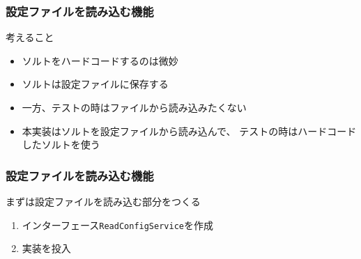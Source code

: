 \begin{frame}
  \frametitle{設定ファイルを読み込む機能}

  \begin{block}{考えること}
    \begin{itemize}
      \item<2-> ソルトをハードコードするのは微妙
      \item<3-> ソルトは設定ファイルに保存する
      \item<4-> 一方、テストの時はファイルから読み込みたくない
        \begin{center}
        \end{center}
      \item<6-> 本実装はソルトを設定ファイルから読み込んで、
        テストの時はハードコードしたソルトを使う
        \begin{center}
        \end{center}
    \end{itemize}
  \end{block}
\end{frame}

\begin{frame}
  \frametitle{設定ファイルを読み込む機能}

  まずは設定ファイルを読み込む部分をつくる
  \begin{enumerate}
    \item<2-> インターフェース\lstinline|ReadConfigService|を作成
      
    \item<3-> 実装を投入
      
  \end{enumerate}
\end{frame}

